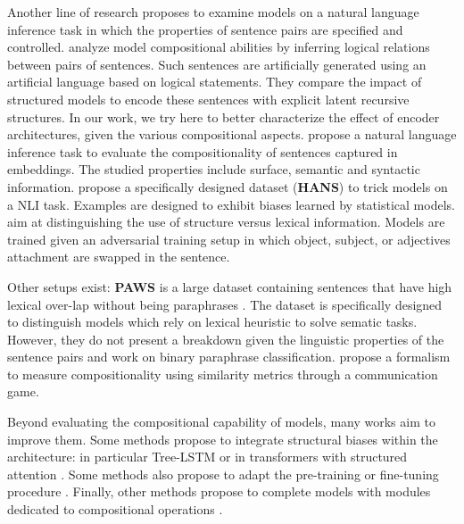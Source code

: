 Another line of research proposes to examine models on a natural language inference task in which the properties of sentence pairs are specified and controlled. 
\textcite{bowman_15} analyze model compositional abilities by inferring logical relations between pairs of sentences. Such sentences are artificially generated using an artificial language based on logical statements. They compare the impact of structured models to encode these sentences with explicit latent recursive structures. In our work, we try here to better characterize the effect of encoder architectures, given the various compositional aspects.
\textcite{dasgupta_18} propose a natural language inference task to evaluate the compositionality of sentences captured in embeddings. The studied properties include surface, semantic and syntactic information. %
\textcite{mccoy_19} propose a specifically designed dataset (\textbf{HANS}) to trick models on a NLI task. Examples are designed to exhibit biases learned by statistical models. 
\textcite{nie_19} aim at distinguishing the use of structure versus lexical information. Models are trained given an adversarial training setup in which object, subject, or adjectives attachment are swapped in the sentence.

Other setups exist: \textbf{PAWS} is a large dataset containing sentences that have high lexical over-lap without being paraphrases \parencite{zhang_19}. The dataset is specifically designed to distinguish models which rely on lexical heuristic to solve sematic tasks. However, they do not present a breakdown given the linguistic properties of the sentence pairs and work on binary paraphrase classification. \textcite{andreas_19} propose a formalism to measure compositionality using similarity metrics through a communication game.

Beyond evaluating the compositional capability of models, many works aim to improve them. Some methods propose to integrate structural biases within the architecture: in particular Tree-LSTM \parencite{tai_15} or in transformers with structured attention \parencite{russin_19}. Some methods also propose to adapt the pre-training or fine-tuning procedure \parencite{furrer_20}. Finally, other methods propose to complete models with modules dedicated to compositional operations \parencite{liu_20, onta_21}.

